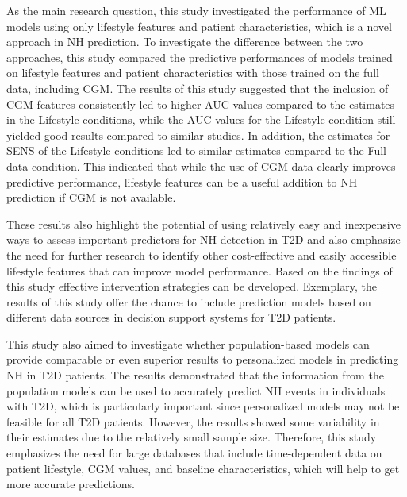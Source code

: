 As the main research question, this study investigated the performance of ML models using only lifestyle features and patient characteristics, which is a novel approach in NH prediction. To investigate the difference between the two approaches, this study compared the predictive performances of models trained on lifestyle features and patient characteristics with those trained on the full data, including CGM. The results of this study suggested that the inclusion of CGM features consistently led to higher AUC values compared to the estimates in the Lifestyle conditions, while the AUC values for the Lifestyle condition still yielded good results compared to similar studies. In addition, the estimates for SENS of the Lifestyle conditions led to similar estimates compared to the Full data condition. This indicated that while the use of CGM data clearly improves predictive performance, lifestyle features can be a useful addition to NH prediction if CGM is not available. 

These results also highlight the potential of using relatively easy and inexpensive ways to assess important predictors for NH detection in T2D and also emphasize the need for further research to identify other cost-effective and easily accessible lifestyle features that can improve model performance. Based on the findings of this study effective intervention strategies can be developed. Exemplary, the results of this study offer the chance to include prediction models based on different data sources in decision support systems for T2D patients.

This study also aimed to investigate whether population-based models can provide comparable or even superior results to personalized models in predicting NH in T2D patients. The results demonstrated that the information from the population models can be used to accurately predict NH events in individuals with T2D, which is particularly important since personalized models may not be feasible for all T2D patients. However, the results showed some variability in their estimates due to the relatively small sample size. Therefore, this study emphasizes the need for large databases that include time-dependent data on patient lifestyle, CGM values, and baseline characteristics, which will help to get more accurate predictions.


